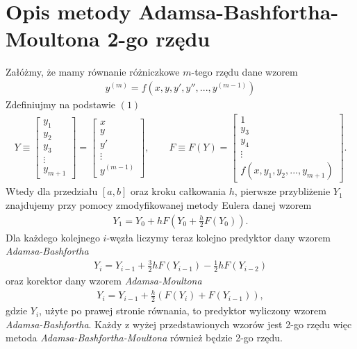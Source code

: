 \documentclass[a4paper,12pt]{article}
\begin{document}
\section*{Opis metody Adamsa-Bashfortha-Moultona 2-go rzędu}
Załóżmy, że mamy równanie różniczkowe $m$-tego rzędu dane wzorem
\begin{align}
y^{(m)} = f(x,y,y',y'',...,y^{(m-1)})
\end{align}
Zdefiniujmy na podstawie $(1)$
\begin{align*}
Y \equiv \begin{bmatrix} 
        y_1\\
        y_2\\
        y_3\\
        \vdots\\
        y_{m+1}
        \end{bmatrix}
        =
        \begin{bmatrix}
        x\\
        y\\
        y'\\
        \vdots\\
        y^{(m-1)}
        \end{bmatrix}
        ,\qquad F \equiv F(Y) = \begin{bmatrix} 
        1\\
        y_3\\
        y_4\\
        \vdots\\
        f(x,y_1,y_2,...,y_{m+1})
        \end{bmatrix}.
\end{align*}
Wtedy dla przedziału $[a,b]$ oraz kroku całkowania $h$, pierwsze przybliżenie $Y_1$ znajdujemy przy pomocy zmodyfikowanej metody Eulera danej wzorem
\begin{align*}
    Y_1 = Y_0 + hF(Y_0 + \frac{h}{2}F(Y_0)).
\end{align*}
Dla każdego kolejnego $i$-węzła liczymy teraz kolejno predyktor dany wzorem \textit{Adamsa-Bashfortha}
\begin{align}
    Y_i = Y_{i-1} + \frac{3}{2}hF(Y_{i-1}) - \frac{1}{2}hF(Y_{i-2})
\end{align}
oraz korektor dany wzorem \textit{Adamsa-Moultona}
\begin{align}
    Y_i = Y_{i-1} + \frac{h}{2}(F(Y_{i}) + F(Y_{i-1})),
\end{align}
gdzie $Y_i$, użyte po prawej stronie równania, to predyktor wyliczony wzorem \textit{Adamsa-Bashfortha}. Każdy z wyżej przedstawionych wzorów jest 2-go rzędu więc metoda \textit{Adamsa-Bashfortha-Moultona} również będzie 2-go rzędu. 
\end{document}
